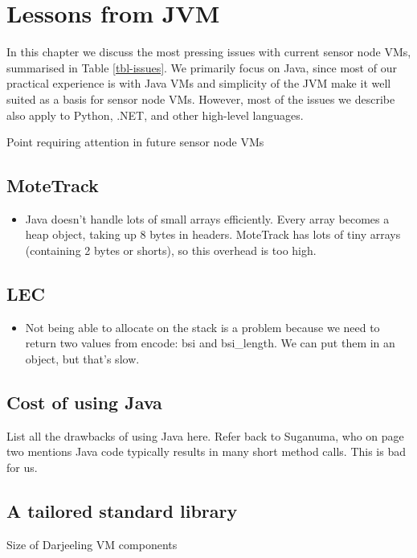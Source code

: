 \chapter{Lessons from JVM}
\label{sec-lessons-from-jvm}
In this chapter we discuss the most pressing issues with current sensor node VMs, summarised in Table \ref{tbl-issues}. We primarily focus on Java, since most of our practical experience is with Java VMs and simplicity of the JVM make it well suited as a basis for sensor node VMs. However, most of the issues we describe also apply to Python, .NET, and other high-level languages.

\begin{table*}
    \centering
    \caption{Point requiring attention in future sensor node VMs}
    \scriptsize
    \label{tbl-issues}
    
\end{table*}


\section{MoteTrack}
\begin{itemize}
	\item Java doesn't handle lots of small arrays efficiently. Every array becomes a heap object, taking up 8 bytes in headers. MoteTrack has lots of tiny arrays (containing 2 bytes or shorts), so this overhead is too high.
\end{itemize}

\section{LEC}
\begin{itemize}
	\item Not being able to allocate on the stack is a problem because we need to return two values from encode: bsi and bsi\_length. We can put them in an object, but that's slow.
\end{itemize}

\section{Cost of using Java}
List all the drawbacks of using Java here.
Refer back to Suganuma, who on page two mentions Java code typically results in many short method calls. This is bad for us.

\section{A tailored standard library}
\label{sec-std-lib}
\begin{table*}
    \centering
    \caption{Size of Darjeeling VM components}
    \scriptsize
    \label{tab-vm-size}
     
\end{table*}

